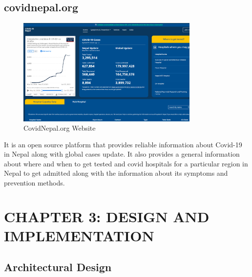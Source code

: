\documentclass[12pt]{article}
\begin{document}
\subsection{covidnepal.org}
\begin{figure}[h]
    \centerline{\includegraphics[width = 90mm]{covidnepal.png}}
    \caption{CovidNepal.org Website}
    \label{fig}
\end{figure}
It is an open source platform that provides reliable information about Covid-19 in Nepal along with global cases update. It also provides a general information about where and when to get tested and covid hospitals for a particular region in Nepal to get admitted along with the information about its symptoms and prevention methods. 
\clearpage

\section{CHAPTER 3: DESIGN AND IMPLEMENTATION}
\subsection{Architectural Design}
\end{document}
